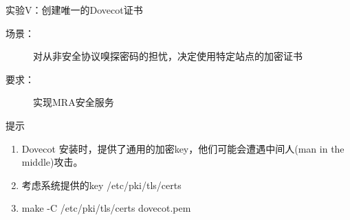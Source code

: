 \begin{frame}{实验V：创建唯一的Dovecot证书}
\begin{description}
\item [{场景：}] 对从非安全协议嗅探密码的担忧，决定使用特定站点的加密证书
\item [{要求：}] 实现MRA安全服务
\end{description}
提示
\begin{enumerate}
\item Dovecot 安装时，提供了通用的加密key，他们可能会遭遇中间人(man in the middle)攻击。
\item 考虑系统提供的key /etc/pki/tls/certs
\item make -C /etc/pki/tls/certs dovecot.pem
\end{enumerate}

\end{frame}

